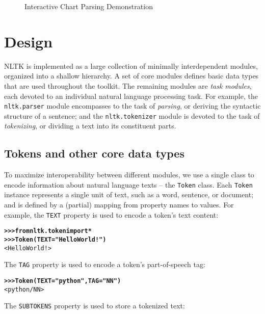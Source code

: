 \documentclass[11pt]{article}
\begin{document}
\begin{figure}[bth]
\caption{Interactive Chart Parsing Demonstration}
\label{fig:chart}
\end{figure}


\section{Design}

NLTK is implemented as a large collection of minimally interdependent
modules, organized into a shallow hierarchy.  A set of core
modules defines basic data types that are used throughout the toolkit.
The remaining modules are \emph{task modules}, each devoted to an
individual natural language processing task.  For example, the
\texttt{nltk.parser} module encompasses to the task of
\emph{parsing}, or deriving the syntactic structure of a sentence; and
the \texttt{nltk.tokenizer} module is devoted to the task of
\emph{tokenizing}, or dividing a text into its constituent parts.

\subsection{Tokens and other core data types}

To maximize interoperability between different modules, we use a
single class to encode information about natural language texts -- the
\texttt{Token} class.  Each \texttt{Token} instance represents a
single unit of text, such as a word, sentence, or document; and is
defined by a (partial) mapping from property names to values.  For
example, the \texttt{TEXT} property is used to encode a token's text
content:

\begin{alltt}\small
\textbf{>>> from nltk.token import *}
\textbf{>>> Token(TEXT="Hello World!")}
<Hello World!>
\end{alltt}
%
The \texttt{TAG} property is used to encode a token's part-of-speech
tag:

\begin{alltt}\small
\textbf{>>> Token(TEXT="python", TAG="NN")}
<python/NN>
\end{alltt}
%
The \texttt{SUBTOKENS} property is used to store a tokenized text:
\end{document}

